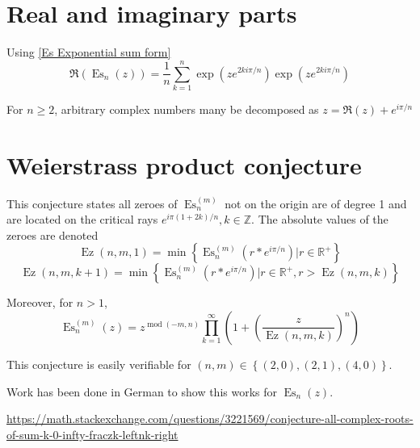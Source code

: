 \documentclass[]{article}
\DeclareMathOperator{\es}{Es}
\DeclareMathOperator{\ez}{Ez}
\DeclareMathOperator{\md}{mod}
\newcommand{\pqty}[1]{{\left(#1\right)}}
\newcommand{\Bqty}[1]{{\left\{#1\right\}}}
\begin{document}
	
	\section{Real and imaginary parts}
	Using \eqref{Es Exponential sum form}
	\begin{equation}
	\Re\pqty{\es_n\pqty{z}}=
	\frac{1}{n}\sum _{k=1}^n \exp\pqty{ze^{2ki\pi/n}}\exp\pqty{ze^{2ki\pi/n}}
	\end{equation}
	
	For $n\geq 2$, arbitrary complex numbers many be decomposed as $z=\Re\pqty{z}+e^{i\pi/n}$
	
	\section{Weierstrass product conjecture}
	This conjecture states all zeroes of $\es_n^{(m)}$ not on the origin are of degree 1 and are located on the critical rays $e^{i\pi(1+2k)/n}, k\in\mathbb{Z}$.
	The absolute values of the zeroes are denoted
	\begin{equation}
	\ez\pqty{n,m,1}=\min\Bqty{\es_n^{(m)}\pqty{r*e^{i\pi/n}}\Big\vert r\in\mathbb{R}^+}
	\end{equation}
	\begin{equation}
	\ez\pqty{n,m,k+1}=\min\Bqty{\es_n^{(m)}\pqty{r*e^{i\pi/n}}\Big\vert r\in\mathbb{R}^+, r>\ez\pqty{n,m,k}}
	\end{equation}
	
	Moreover, for $n>1$,
	\begin{equation}
	\es_n^{(m)}\pqty{z}=z^{\md\pqty{-m,n}}\prod_{k=1}^{\infty}\pqty{1+\pqty{\frac{z}{\ez\pqty{n,m,k}}}^n}
	\end{equation}
	
	This conjecture is easily verifiable for $\pqty{n,m}\in\Bqty{\pqty{2,0}, \pqty{2,1}, \pqty{4,0}}$.
	
	Work has been done in German to show this works for \(\es_n\pqty{z}\).
	
	\url{https://math.stackexchange.com/questions/3221569/conjecture-all-complex-roots-of-sum-k-0-infty-fraczk-leftnk-right}
	
\end{document}
